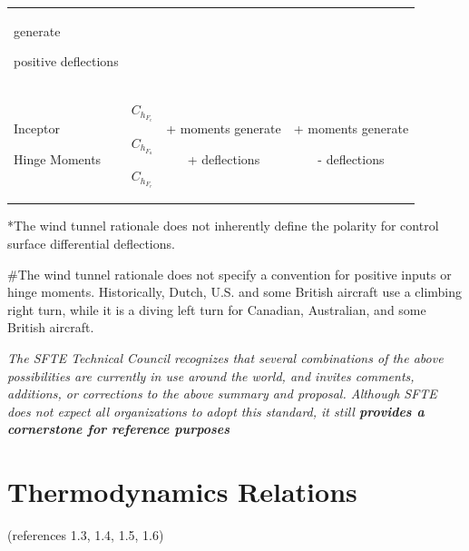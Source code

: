 \documentclass[
]{book}
\begin{document}
\begin{longtable}[]{@{}lccc@{}}
\begin{minipage}[t]{0.15\columnwidth}
generate

positive deflections\strut
\end{minipage} & \begin{minipage}[t]{0.15\columnwidth}\centering
\strut
\end{minipage}\tabularnewline
\begin{minipage}[t]{0.38\columnwidth}\raggedright
Inceptor

Hinge Moments\strut
\end{minipage} & \begin{minipage}[t]{0.20\columnwidth}\centering
\(C_{h_{F_e}}\)

\(C_{h_{F_a}}\)

\(C_{h_{F_r}}\)\strut
\end{minipage} & \begin{minipage}[t]{0.15\columnwidth}\centering
+ moments generate

+ deflections\strut
\end{minipage} & \begin{minipage}[t]{0.15\columnwidth}\centering
+ moments generate

- deflections\strut
\end{minipage}\tabularnewline
\bottomrule
\end{longtable}

*The wind tunnel rationale does not inherently define the polarity for control surface differential deflections.

\#The wind tunnel rationale does not specify a convention for positive inputs or hinge moments. Historically, Dutch, U.S. and some British aircraft use a climbing right turn, while it is a diving left turn for Canadian, Australian, and some British aircraft.

\emph{The SFTE Technical Council recognizes that several combinations of the above possibilities are currently in use around the world, and invites comments, additions, or corrections to the above summary and proposal. Although SFTE does not expect all organizations to adopt this standard, it still \textbf{provides a cornerstone for reference purposes}}

\hypertarget{thermodynamics-relations}{%
\section{Thermodynamics Relations}\label{thermodynamics-relations}}

(references 1.3, 1.4, 1.5, 1.6)
\end{document}
